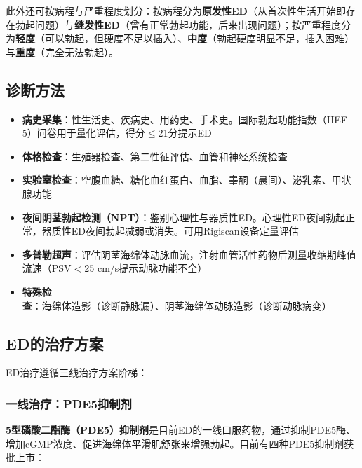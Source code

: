 \documentclass[12pt,a4paper,twoside]{ctexbook}
\begin{document}
此外还可按病程与严重程度划分：按病程分为\textbf{原发性ED}（从首次性生活开始即存在勃起问题）与\textbf{继发性ED}（曾有正常勃起功能，后来出现问题）；按严重程度分为\textbf{轻度}（可以勃起，但硬度不足以插入）、\textbf{中度}（勃起硬度明显不足，插入困难）与\textbf{重度}（完全无法勃起）。

\subsection{诊断方法}

\begin{itemize}[leftmargin=2cm]
	\item \textbf{病史采集}：性生活史、疾病史、用药史、手术史。国际勃起功能指数（IIEF-5）问卷用于量化评估，得分$\leq$21分提示ED
	\item \textbf{体格检查}：生殖器检查、第二性征评估、血管和神经系统检查
	\item \textbf{实验室检查}：空腹血糖、糖化血红蛋白、血脂、睾酮（晨间）、泌乳素、甲状腺功能
	\item \textbf{夜间阴茎勃起检测（NPT）}：鉴别心理性与器质性ED。心理性ED夜间勃起正常，器质性ED夜间勃起减弱或消失。可用Rigiscan设备定量评估
	\item \textbf{多普勒超声}：评估阴茎海绵体动脉血流，注射血管活性药物后测量收缩期峰值流速（PSV$<$25 cm/s提示动脉功能不全）
	\item \textbf{特殊检查}：海绵体造影（诊断静脉漏）、阴茎海绵体动脉造影（诊断动脉病变）
\end{itemize}

\subsection{ED的治疗方案}

ED治疗遵循三线治疗方案阶梯：

\subsubsection{一线治疗：PDE5抑制剂}

\textbf{5型磷酸二酯酶（PDE5）抑制剂}是目前ED的一线口服药物，通过抑制PDE5酶、增加cGMP浓度、促进海绵体平滑肌舒张来增强勃起。目前有四种PDE5抑制剂获批上市：
\end{document}
